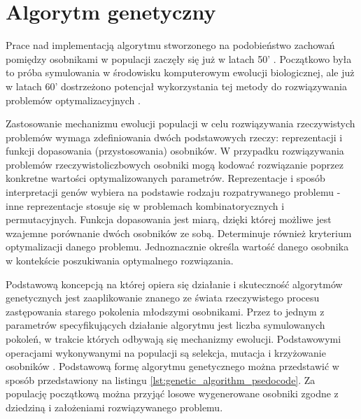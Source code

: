 \section{Algorytm genetyczny}
\par 
Prace nad implementacją algorytmu stworzonego na podobieństwo zachowań pomiędzy osobnikami w populacji zaczęły się już w latach 50' \cite{barker1958simulation}. Początkowo była to próba symulowania w środowisku komputerowym ewolucji biologicznej, ale już w latach 60' dostrzeżono potencjał wykorzystania tej metody do rozwiązywania problemów optymalizacyjnych \cite{bremermann1962optimization}.
\par
Zastosowanie mechanizmu ewolucji populacji w celu rozwiązywania rzeczywistych problemów wymaga zdefiniowania dwóch podstawowych rzeczy: reprezentacji i funkcji dopasowania (przystosowania) osobników. W przypadku rozwiązywania problemów rzeczywistoliczbowych osobniki mogą kodować rozwiązanie poprzez konkretne wartości optymalizowanych parametrów. Reprezentacje i sposób interpretacji genów wybiera na podstawie rodzaju rozpatrywanego problemu - inne reprezentacje stosuje się w problemach kombinatorycznych i permutacyjnych. Funkcja dopasowania jest miarą, dzięki której możliwe jest wzajemne porównanie dwóch osobników ze sobą. Determinuje również kryterium optymalizacji danego problemu. Jednoznacznie określa wartość danego osobnika w kontekście poszukiwania optymalnego rozwiązania. 
\par
Podstawową koncepcją na której opiera się działanie i skuteczność algorytmów genetycznych jest zaaplikowanie znanego ze świata rzeczywistego procesu zastępowania starego pokolenia młodszymi osobnikami. Przez to jednym z parametrów specyfikujących działanie algorytmu jest liczba symulowanych pokoleń, w trakcie których odbywają się mechanizmy ewolucji. Podstawowymi operacjami wykonywanymi na populacji są selekcja, mutacja i krzyżowanie osobników \cite{sudholt2008computational}. Podstawową formę algorytmu genetycznego można przedstawić w sposób przedstawiony na listingu \ref{lst:genetic_algorithm_psedocode}. Za populację początkową można przyjąć losowe wygenerowane osobniki zgodne z dziedziną i założeniami rozwiązywanego problemu.
